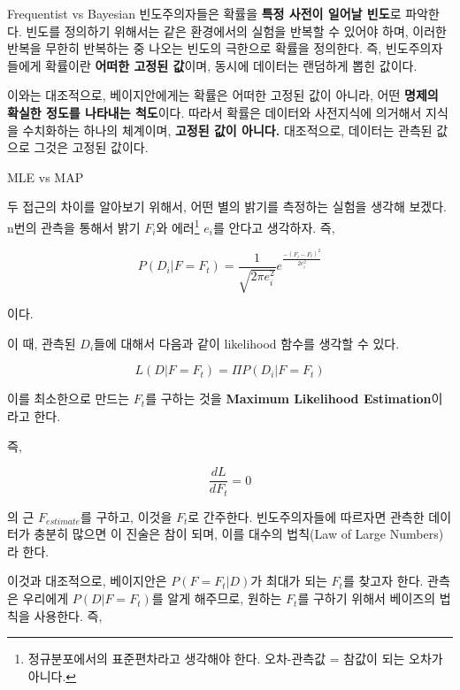 \documentclass{beamer}
\begin{document}
\begin{frame}{Frequentist vs Bayesian} 
빈도주의자들은 확률을 \textbf{특정 사전이 일어날 빈도}로 파악한다. 빈도를 정의하기 위해서는 같은 환경에서의 실험을 반복할 수 있어야 하며, 이러한 반복을 무한히 반복하는 중 나오는 빈도의 극한으로 확률을 정의한다. 즉, 빈도주의자들에게 확률이란 \textbf{어떠한 고정된 값}이며, 동시에 데이터는 랜덤하게 뽑힌 값이다. 

이와는 대조적으로, 베이지안에게는 확률은 어떠한 고정된 값이 아니라, 어떤 \textbf{명제의 확실한 정도를 나타내는 척도}이다. 따라서 확률은 데이터와 사전지식에 의거해서 지식을 수치화하는 하나의 체계이며, \textbf{고정된 값이 아니다.} 대조적으로, 데이터는 관측된 값으로 그것은 고정된 값이다. 
\end{frame}

\begin{frame}[allowframebreaks]{MLE vs MAP}

두 접근의 차이를 알아보기 위해서, 어떤 별의 밝기를 측정하는 실험을 생각해 보겠다. n번의 관측을 통해서 밝기 $F_i$와 에러\footnote{정규분포에서의 표준편차라고 생각해야 한다. 오차-관측값 = 참값이 되는 오차가 아니다. } $e_i$를 안다고 생각하자. 즉, 

\begin{equation}
P(D_i|F = F_t) = \frac{1}{\sqrt{2 \pi e_i^2}}e^{\frac{-(F_i - F_t)^2}{2e_i^2}}
\end{equation}

이다. 

\framebreak

이 때, 관측된 $D_i$들에 대해서 다음과 같이 likelihood 함수를 생각할 수 있다. 

\begin{equation} 
L(D|F = F_t) = \Pi P(D_i|F = F_t)
\end{equation} 

이를 최소한으로 만드는 $F_t$를 구하는 것을 \textbf{Maximum Likelihood Estimation}이라고 한다. 

\framebreak

즉, 

\begin{equation} 
\frac{dL}{dF_t} = 0
\end{equation}

의 근 $F_{estimate}$를 구하고, 이것을 $F_t$로 간주한다. 빈도주의자들에 따르자면 관측한 데이터가 충분히 많으면 이 진술은 참이 되며, 이를 대수의 법칙(Law of Large Numbers)라 한다. 


\framebreak

이것과 대조적으로, 베이지안은 $P(F=F_t|D)$가 최대가 되는 $F_t$를 찾고자 한다. 관측은 우리에게 $P(D|F=F_t)$를 알게 해주므로, 원하는 $F_t$를 구하기 위해서 베이즈의 법칙을 사용한다. 즉, 


\end{frame}
\end{document}
